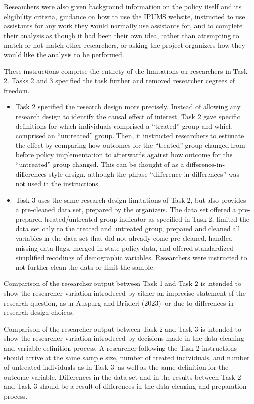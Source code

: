 \documentclass[
  letterpaper,
  DIV=11,
  numbers=noendperiod]{scrartcl}
\begin{document}
Researchers were also given background information on the policy itself
and its eligibility criteria, guidance on how to use the IPUMS website,
instructed to use assistants for any work they would normally use
assistants for, and to complete their analysis as though it had been
their own idea, rather than attempting to match or not-match other
researchers, or asking the project organizers how they would like the
analysis to be performed.

These instructions comprise the entirety of the limitations on
researchers in Task 2. Tasks 2 and 3 specified the task further and
removed researcher degrees of freedom.

\begin{itemize}
\item
  Task 2 specified the research design more precisely. Instead of
  allowing any research design to identify the causal effect of
  interest, Task 2 gave specific definitions for which individuals
  comprised a ``treated'' group and which comprised an ``untreated''
  group. Then, it instructed researchers to estimate the effect by
  comparing how outcomes for the ``treated'' group changed from before
  policy implementation to afterwards against how outcome for the
  ``untreated'' group changed. This can be thought of as a
  difference-in-differences style design, although the phrase
  ``difference-in-differences'' was not used in the instructions.
\item
  Task 3 uses the same research design limitations of Task 2, but also
  provides a pre-cleaned data set, prepared by the organizers. The data
  set offered a pre-prepared treated/untreated-group indicator as
  specified in Task 2, limited the data set only to the treated and
  untreated group, prepared and cleaned all variables in the data set
  that did not already come pre-cleaned, handled missing-data flags,
  merged in state policy data, and offered standardized simplified
  recodings of demographic variables. Researchers were instructed to not
  further clean the data or limit the sample.
\end{itemize}

Comparison of the researcher output between Task 1 and Task 2 is
intended to show the researcher variation introduced by either an
imprecise statement of the research question, as in Auspurg and Brüderl
(2023), or due to differences in research design choices.

Comparison of the researcher output between Task 2 and Task 3 is
intended to show the researcher variation introduced by decisions made
in the data cleaning and variable definition process. A researcher
following the Task 2 instructions should arrive at the same sample size,
number of treated individuals, and number of untreated individuals as in
Task 3, as well as the same definition for the outcome variable.
Differences in the data set and in the results between Task 2 and Task 3
should be a result of differences in the data cleaning and preparation
process.
\end{document}
